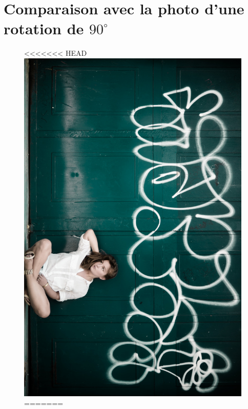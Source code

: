 \section{Comparaison avec la photo d'une rotation de
$90^{\circ}$}\label{comparaison-avec-la-photo-dune-rotation-de-90circ}

\begin{figure}[htbp]
\centering
<<<<<<< HEAD
\includegraphics[scale=0.42]{../../photos/rotation.jpg}
=======

\end{figure}
